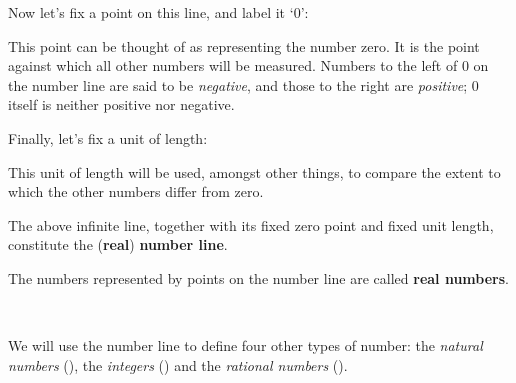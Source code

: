Now let's fix a point on this line, and label it `$0$':
\begin{center}
\end{center}
This point can be thought of as representing the number zero. It is the point against which all other numbers will be measured. Numbers to the left of $0$ on the number line are said to be \textit{negative}, and those to the right are \textit{positive}; $0$ itself is neither positive nor negative.

Finally, let's fix a unit of length:
\begin{center}
\end{center}
This unit of length will be used, amongst other things, to compare the extent to which the other numbers differ from zero.

\begin{definition}
\label{defNumberLine}
The above infinite line, together with its fixed zero point and fixed unit length, constitute the (\textbf{real}) \textbf{number line}.

The numbers represented by points on the number line are called \textbf{real numbers}.
\begin{center}
\end{center}
~
\end{definition}

We will use the number line to define four other types of number: the \textit{natural numbers} (), the \textit{integers} () and the \textit{rational numbers} ().

